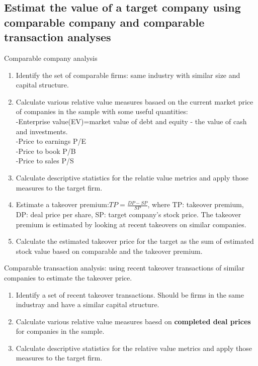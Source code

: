 \documentclass{article}
\newcommand{\be}{\begin{enumerate}}
\newcommand{\ee}{\end{enumerate}}
\begin{document}
\subsection{Estimat the value of a target company using comparable company
and comparable transaction analyses}
Comparable company analysis
\be
    \item Identify the set of comparable firms: same industry with similar size and capital structure.
    \item Calculate various relative value measures basaed on the current market price
        of companies in the sample with some useful quantities: 
        \\-Enterprise value(EV)=market value of debt and equity - the value of cash and investments.
        \\-Price to earnings P/E
        \\-Price to book P/B
        \\-Price to sales P/S
    \item Calculate descriptive statistics for the relatie value metrics and apply
        those measures to the target firm.
    \item Estimate a takeover premium:$TP=\frac{DP-SP}{SP}$, where TP: takeover premium,
        DP: deal price per share, SP: target company's stock price. The takeover
        premium is estimated by looking at recent takeovers on similar companies.
    \item Calculate the estimated takeover price for the target as the sum of
        estimated stock value based on comparable and the takeover premium.
\ee
Comparable transaction analysis: using recent takeover transactions of similar
companies to estimate the takeover price.
\be
    \item Identify a set of recent takeover transactions. Should be firms
        in the same industray and have a similar capital structure.
    \item Calculate various relative value measures baesd on \textbf{completed deal prices} for
        companies in the sample. 
    \item Calculate descriptive statistics for the relative value metrics and apply
        those measures to the target firm.
\ee
\end{document}
